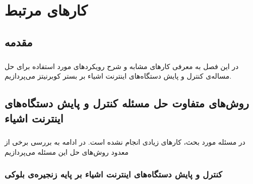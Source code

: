 
\chapter{کارهای مرتبط} \label{ch:related}
\thispagestyle{empty}


\section{مقدمه}
\label{sec:intro}
\paragraph{}
{
    در این فصل به معرفی کارهای مشابه و شرح
    رویکردهای مورد استفاده برای حل مساله‌ی 
    کنترل و پایش دستگاه‌های اینترنت اشیاء بر بستر کوبرنیتز می‌پردازیم.    
}

\section{
    روش‌های متفاوت حل مسئله کنترل و پایش دستگاه‌های اینترنت اشیاء
}
\label{sec:approaches_to_monitoring_iot}
\paragraph{}{
    در مسئله مورد بحث، کارهای زیادی انجام نشده است. در ادامه به بررسی برخی از معدود روش‌های حل این مسئله می‌پردازیم
}
\subsection{
    کنترل و پایش دستگاه‌های اینترنت اشیاء بر پایه زنجیره‌ی بلوکی
}
\label{sec:blockchain_based_monitoring}
